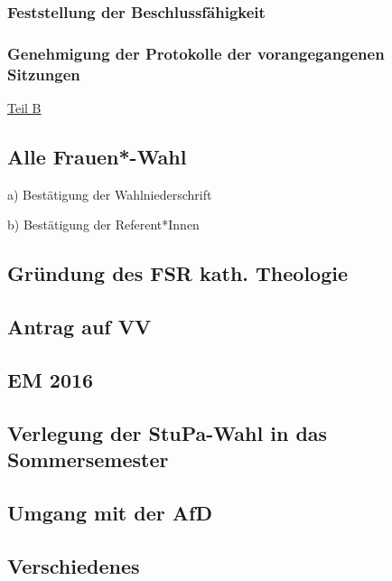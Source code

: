 \documentclass[ngerman,headheight=70pt]{scrartcl}
\begin{document}
    \subsubsection{Feststellung der Beschlussfähigkeit}

    \subsubsection{Genehmigung der Protokolle der vorangegangenen Sitzungen}

    \vspace{1cm}
    {\Large \underline{Teil B}}


    \subsection{Alle Frauen*-Wahl}

    a) Bestätigung der Wahlniederschrift

    b) Bestätigung der Referent*Innen

    \subsection{Gründung des FSR kath. Theologie}

    \subsection{Antrag auf VV}

    \subsection{EM 2016}

    \subsection{Verlegung der StuPa-Wahl in das Sommersemester}

    \subsection{Umgang mit der AfD}

    \subsection{Verschiedenes}
\end{document}
